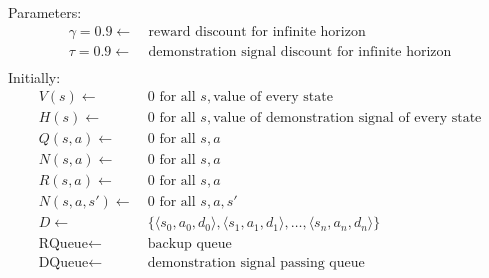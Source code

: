 \documentclass{article}
\begin{document}
\begin{comment}

Parameters:
\[\begin{split}
  \alpha = 0.1 \leftarrow\ & q(s,a)\ \text{learning rate}\\
  \gamma = 0.9 \leftarrow\ & \text{discount for infinite horizon}\\
  \tau = \alpha \leftarrow\ & \text{temperature diffusion coefficient}\\
  \delta = 0.995 \leftarrow\ & \text{temperature decay coefficient}\\
  \text{\it MaxTemp} = 50 \leftarrow\ &  \text{maximum temperature}\\
  \text{\it MinTemp} = 2 \leftarrow\ &  \text{minimum temperature}\\
  \theta \leftarrow\ & \text{lenience moderation factor}\\
\end{split}\]

\end{comment}
Parameters:
\[
\begin{split}
\gamma = 0.9 \leftarrow\ & \text{reward discount for infinite horizon }\\
\tau = 0.9 \leftarrow\ & \text{demonstration signal discount for infinite horizon}\\
\end{split}
\]
Initially:
\[\begin{split}
V(s) \leftarrow &\ 0 \text{ for all } s, \text{value of every state}\\
H(s) \leftarrow &\ 0 \text{ for all } s, \text{value of demonstration signal of every state}\\
Q(s,a) \leftarrow &\ 0 \text{ for all } s,a\\
N(s,a) \leftarrow &\ 0 \text{ for all } s,a\\
R(s,a) \leftarrow &\ 0  \text{ for all } s,a\\
N(s,a,s') \leftarrow &\ 0  \text{ for all } s,a,s'\\
D \leftarrow &\ \{\langle s_0,a_0,d_0\rangle , \langle s_1,a_1,d_1\rangle , \ldots ,\langle s_n,a_n,d_n\rangle \}\\
\text{RQueue} \leftarrow &\ \text{backup queue}\\
\text{DQueue} \leftarrow &\ \text{demonstration signal passing queue}
\end{split}\]
\end{document}
